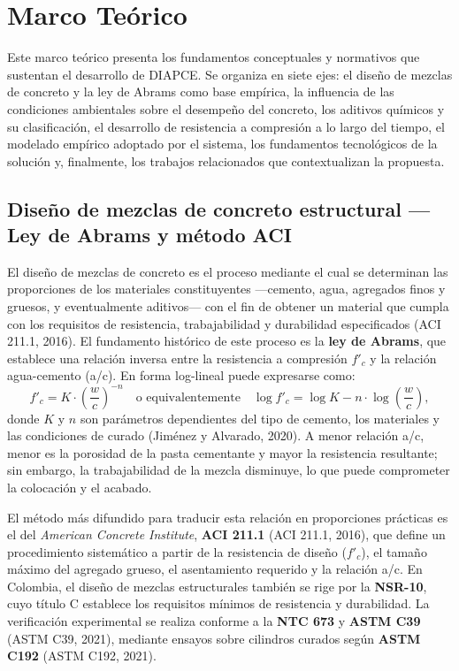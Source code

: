 \documentclass[12pt, letterpaper]{article}
\begin{document}
\newpage
\section{Marco Teórico}

Este marco teórico presenta los fundamentos conceptuales y normativos que sustentan el desarrollo de DIAPCE. Se organiza en siete ejes: el diseño de mezclas de concreto y la ley de Abrams como base empírica, la influencia de las condiciones ambientales sobre el desempeño del concreto, los aditivos químicos y su clasificación, el desarrollo de resistencia a compresión a lo largo del tiempo, el modelado empírico adoptado por el sistema, los fundamentos tecnológicos de la solución y, finalmente, los trabajos relacionados que contextualizan la propuesta.

\subsection{Diseño de mezclas de concreto estructural — Ley de Abrams y método ACI}

El diseño de mezclas de concreto es el proceso mediante el cual se determinan las proporciones de los materiales constituyentes ---cemento, agua, agregados finos y gruesos, y eventualmente aditivos--- con el fin de obtener un material que cumpla con los requisitos de resistencia, trabajabilidad y durabilidad especificados (ACI 211.1, 2016). El fundamento histórico de este proceso es la \textbf{ley de Abrams}, que establece una relación inversa entre la resistencia a compresión $f'_c$ y la relación agua-cemento (a/c). En forma log-lineal puede expresarse como:
\[
f'_c = K \cdot \left(\frac{w}{c}\right)^{-n}
\quad\text{o equivalentemente}\quad
\log f'_c = \log K - n \cdot \log\!\left(\frac{w}{c}\right),
\]
donde $K$ y $n$ son parámetros dependientes del tipo de cemento, los materiales y las condiciones de curado (Jiménez y Alvarado, 2020). A menor relación a/c, menor es la porosidad de la pasta cementante y mayor la resistencia resultante; sin embargo, la trabajabilidad de la mezcla disminuye, lo que puede comprometer la colocación y el acabado.

El método más difundido para traducir esta relación en proporciones prácticas es el del \textit{American Concrete Institute}, \textbf{ACI 211.1} (ACI 211.1, 2016), que define un procedimiento sistemático a partir de la resistencia de diseño ($f'_c$), el tamaño máximo del agregado grueso, el asentamiento requerido y la relación a/c. En Colombia, el diseño de mezclas estructurales también se rige por la \textbf{NSR-10}, cuyo título C establece los requisitos mínimos de resistencia y durabilidad. La verificación experimental se realiza conforme a la \textbf{NTC 673} y \textbf{ASTM C39} (ASTM C39, 2021), mediante ensayos sobre cilindros curados según \textbf{ASTM C192} (ASTM C192, 2021).
\end{document}
